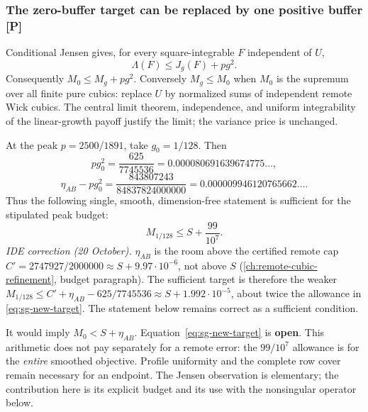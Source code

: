 \subsubsection{The zero-buffer target can be replaced by one positive buffer [P]}
Conditional Jensen gives, for every square-integrable $F$ independent of $U$,
\begin{equation}\label{eq:sg-smoothing}
 \Lambda(F)\le J_g(F)+pg^2.
\end{equation}
Consequently $M_0\le M_g+pg^2$. Conversely $M_g\le M_0$ when $M_0$
is the supremum over all finite pure cubics: replace $U$ by normalized sums
of independent remote Wick cubics. The central limit theorem, independence,
and uniform integrability of the linear-growth payoff justify the limit;
the variance price is unchanged.

At the peak $p=2500/1891$, take $g_0=1/128$. Then
\[
 pg_0^2=\frac{625}{7745536}=0.000080691639674775\ldots,
\]
\[
 \eta_{AB}-pg_0^2
 =\frac{843807243}{84837824000000}
 =0.000009946120765662\ldots.
\]
Thus the following single, smooth, dimension-free statement is sufficient
for the stipulated peak budget:
\begin{equation}\label{eq:sg-new-target}
 \boxed{M_{1/128}\le S+\frac{99}{10^7}.}
\end{equation}
\emph{IDE correction (20 October).} $\eta_{AB}$ is the room above the certified remote cap $C'=2747927/2000000\approx S+9.97\cdot10^{-6}$, not above $S$
(\autoref{ch:remote-cubic-refinement}, budget paragraph). The sufficient target is therefore the weaker
$M_{1/128}\le C'+\eta_{AB}-625/7745536\approx S+1.992\cdot10^{-5}$, about twice the allowance in \eqref{eq:sg-new-target}. The statement below remains correct as a sufficient
condition.

It would imply $M_0<S+\eta_{AB}$. Equation~\eqref{eq:sg-new-target} is
\textbf{open}. This arithmetic does not pay separately for a remote error:
the $99/10^7$ allowance is for the \emph{entire} smoothed objective.
Profile uniformity and the complete row cover remain necessary for an endpoint.
The Jensen observation is elementary; the contribution here is its explicit
budget and its use with the nonsingular operator below.

